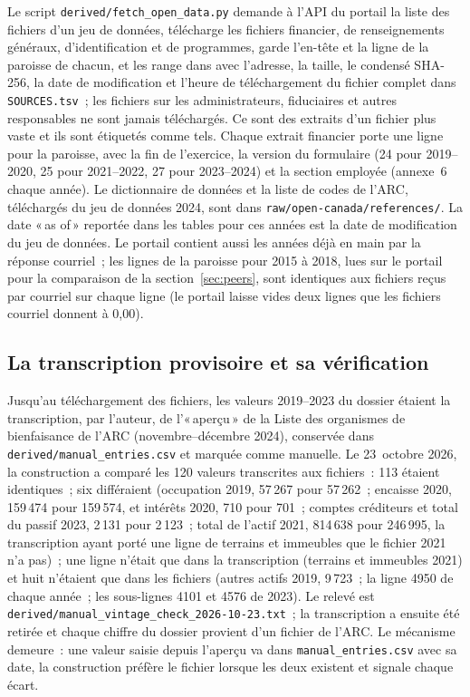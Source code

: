 \documentclass[11pt,letterpaper]{article}
\begin{document}
Le script \texttt{derived/fetch\_open\_data.py} demande à l'API du portail la liste des fichiers d'un jeu de données, télécharge les fichiers financier, de renseignements généraux, d'identification et de programmes, garde l'en-tête et la ligne de la paroisse de chacun, et les range dans  avec l'adresse, la taille, le condensé SHA-256, la date de modification et l'heure de téléchargement du fichier complet dans \texttt{SOURCES.tsv}~; les fichiers sur les administrateurs, fiduciaires et autres responsables ne sont jamais téléchargés. Ce sont des extraits d'un fichier plus vaste et ils sont étiquetés comme tels. Chaque extrait financier porte une ligne pour la paroisse, avec la fin de l'exercice, la version du formulaire (24 pour 2019--2020, 25 pour 2021--2022, 27 pour 2023--2024) et la section employée (annexe~6 chaque année). Le dictionnaire de données et la liste de codes de l'ARC, téléchargés du jeu de données 2024, sont dans \texttt{raw/open-canada/references/}. La date «\,as of\,» reportée dans les tables pour ces années est la date de modification du jeu de données. Le portail contient aussi les années déjà en main par la réponse courriel~; les lignes de la paroisse pour 2015 à 2018, lues sur le portail pour la comparaison de la section~\ref{sec:peers}, sont identiques aux fichiers reçus par courriel sur chaque ligne (le portail laisse vides deux lignes que les fichiers courriel donnent à 0,00).

\subsection{La transcription provisoire et sa vérification}\label{sec:interim}

Jusqu'au téléchargement des fichiers, les valeurs 2019--2023 du dossier étaient la transcription, par l'auteur, de l'«\,aperçu\,» de la Liste des organismes de bienfaisance de l'ARC (novembre--décembre 2024), conservée dans \texttt{derived/manual\_entries.csv} et marquée comme manuelle. Le 23~octobre 2026, la construction a comparé les 120 valeurs transcrites aux fichiers~: 113 étaient identiques~; six différaient (occupation 2019, 57\,267 pour 57\,262~; encaisse 2020, 159\,474 pour 159\,574, et intérêts 2020, 710 pour 701~; comptes créditeurs et total du passif 2023, 2\,131 pour 2\,123~; total de l'actif 2021, 814\,638 pour 246\,995, la transcription ayant porté une ligne de terrains et immeubles que le fichier 2021 n'a pas)~; une ligne n'était que dans la transcription (terrains et immeubles 2021) et huit n'étaient que dans les fichiers (autres actifs 2019, 9\,723~; la ligne 4950 de chaque année~; les sous-lignes 4101 et 4576 de 2023). Le relevé est \texttt{derived/manual\_vintage\_check\_2026-10-23.txt}~; la transcription a ensuite été retirée et chaque chiffre du dossier provient d'un fichier de l'ARC. Le mécanisme demeure~: une valeur saisie depuis l'aperçu va dans \texttt{manual\_entries.csv} avec sa date, la construction préfère le fichier lorsque les deux existent et signale chaque écart.
\end{document}
